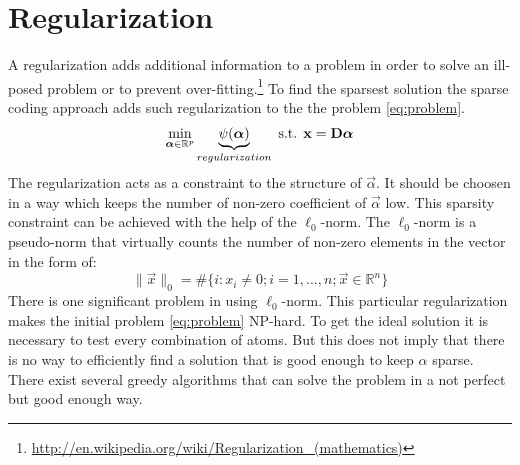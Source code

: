 \section{Regularization}
A regularization adds additional information to a problem in order to solve an
ill-posed problem or to prevent over-fitting.\footnote{\url{
http://en.wikipedia.org/wiki/Regularization_(mathematics)}}
To find the sparsest solution the sparse coding approach adds such
regularization to the the problem \ref{eq:problem}. 
\begin{equation}
\min_{\boldsymbol{\mathrm{\alpha}}\in\mathbb{R}^{p}}
\underbrace{\psi(\boldsymbol{\mathrm{\alpha}})}_{regularization} \text{ s.t. }
\boldsymbol{\mathrm{x}} = \boldsymbol{\mathrm{D}}\boldsymbol{\mathrm{\alpha}}\label{eq:problem}
\end{equation}
The regularization acts as a constraint to the structure of $\vec{\alpha}$. It
should be choosen in a way which keeps the number of non-zero coefficient of
$\vec{\alpha}$ low. 
This sparsity constraint can be achieved with the help of
the $\ell_0$-norm. The $\ell_0$-norm is a pseudo-norm that virtually counts the
number of non-zero elements in the vector in the form of:
\begin{equation}
\lVert \vec{x} \rVert_{0} = \#\{i:x_i \neq 
0; i=1,...,n; \vec{x}\in\mathbb{R}^n\} 
\end{equation}
There is one significant problem in using $\ell_0$-norm. This particular
regularization makes the initial problem \ref{eq:problem} NP-hard. To get the
ideal solution it is necessary to test every combination of atoms. But this
does not imply that there is no way to efficiently find a solution that is good
enough to keep $\alpha$ sparse. There exist several greedy algorithms that can
solve the problem in a not perfect but good enough way. 

